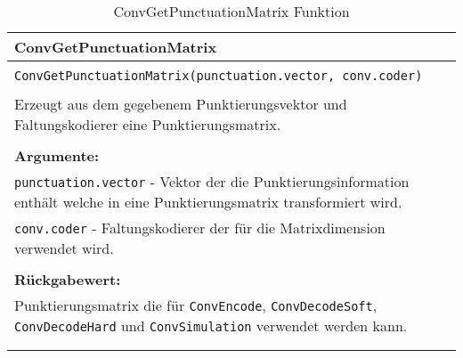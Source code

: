 \begin{longtable}{|p{\textwidth}|}
\hline
\rowcolor{lightblue}
ConvGetPunctuationMatrix
\\
\hline
\\
\texttt{ConvGetPunctuationMatrix(punctuation.vector, conv.coder)}\\
\\
Erzeugt aus dem gegebenem Punktierungsvektor und Faltungskodierer eine Punktierungsmatrix.\\
\\
\textbf{Argumente:}\\
\texttt{punctuation.vector} - Vektor der die Punktierungsinformation enthält welche in eine Punktierungsmatrix transformiert wird.\\
\texttt{conv.coder} - Faltungskodierer der für die Matrixdimension verwendet wird.\\
\\
\textbf{Rückgabewert:}\\
Punktierungsmatrix die für \texttt{ConvEncode}, \texttt{ConvDecodeSoft}, \texttt{ConvDecodeHard} und \texttt{ConvSimulation} verwendet werden kann.\\
\\
\hline
\caption{ConvGetPunctuationMatrix Funktion}
\end{longtable}